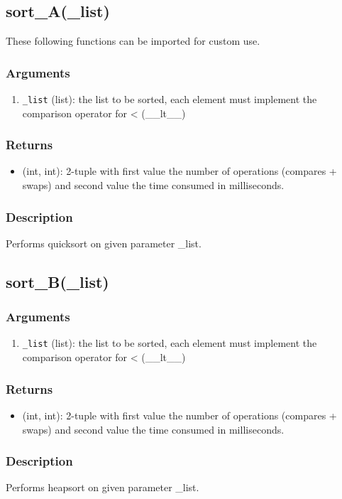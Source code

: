 \subsection{sort\_A(\_list)}
These following functions can be imported for custom use.
\subsubsection*{Arguments}
\begin{enumerate}
    \item \texttt{\_list} (list): the list to be sorted, each element must implement the comparison operator for < (\_\_lt\_\_)
\end{enumerate}
\subsubsection*{Returns}
\begin{itemize}
    \item (int, int): 2-tuple with first value the number of operations (compares + swaps) and second value the time consumed in milliseconds.
\end{itemize}
\subsubsection*{Description}
Performs quicksort on given parameter \_list.
\subsection{sort\_B(\_list)}
\subsubsection*{Arguments}
\begin{enumerate}
    \item \texttt{\_list} (list): the list to be sorted, each element must implement the comparison operator for < (\_\_lt\_\_)
\end{enumerate}
\subsubsection*{Returns}
\begin{itemize}
    \item (int, int): 2-tuple with first value the number of operations (compares + swaps) and second value the time consumed in milliseconds.
\end{itemize}
\subsubsection*{Description}
Performs heapsort on given parameter \_list.
